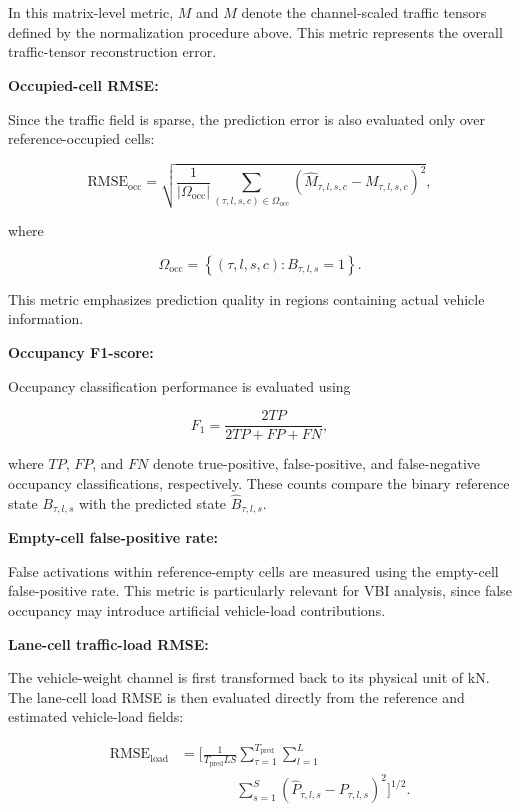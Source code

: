 \documentclass[journal]{IEEEtran}
\begin{document}
In this matrix-level metric, $M$ and $\widehat{M}$ denote the channel-scaled traffic tensors defined by the normalization procedure above. This metric represents the overall traffic-tensor reconstruction error.

\textbf{Occupied-cell RMSE:}

Since the traffic field is sparse, the prediction error is also evaluated only
over reference-occupied cells:

\begin{equation}
\mathrm{RMSE}_{\mathrm{occ}}
=
\sqrt{
\frac{1}{|\Omega_{\mathrm{occ}}|}
\sum_{(\tau,l,s,c)\in\Omega_{\mathrm{occ}}}
\left(
\widehat{M}_{\tau,l,s,c}
-
M_{\tau,l,s,c}
\right)^2
},
\end{equation}

where

\begin{equation}
\Omega_{\mathrm{occ}}
=
\left\{
(\tau,l,s,c)
:
B_{\tau,l,s}=1
\right\}.
\end{equation}

This metric emphasizes
prediction quality in regions containing actual vehicle information.

\textbf{Occupancy F1-score:}

Occupancy classification performance is evaluated using

\begin{equation}
F_1
=
\frac{2TP}
{2TP+FP+FN},
\end{equation}

where $TP$, $FP$, and $FN$ denote true-positive, false-positive, and false-negative occupancy classifications, respectively. These counts compare the binary reference state $B_{\tau,l,s}$ with the predicted state $\widehat{B}_{\tau,l,s}$.

\textbf{Empty-cell false-positive rate:}

False activations within reference-empty cells are measured using the
empty-cell false-positive rate. This metric is particularly relevant for VBI
analysis, since false occupancy may introduce artificial vehicle-load
contributions.

\textbf{Lane-cell traffic-load RMSE:}

The vehicle-weight channel is first transformed back to its physical unit of
kN. The lane-cell load RMSE is then evaluated directly from the reference and
estimated vehicle-load fields:

\begin{equation}
\begin{aligned}
\mathrm{RMSE}_{\mathrm{load}}
&=
\Bigg[
\frac{1}
{T_{\mathrm{pred}}LS}
\sum_{\tau=1}^{T_{\mathrm{pred}}}
\sum_{l=1}^{L}
\\
&\qquad\qquad
\sum_{s=1}^{S}
\left(
\widehat{P}_{\tau,l,s}
-
P_{\tau,l,s}
\right)^2
\Bigg]^{1/2}.
\end{aligned}
\end{equation}
\end{document}
